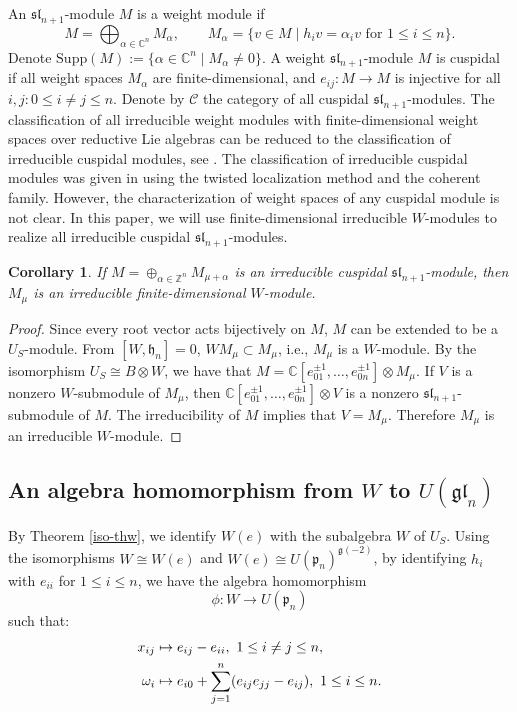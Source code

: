 \documentclass[12pt,a4paper]{amsart}
\newtheorem{corollary}[theorem]{Corollary}%
\numberwithin{equation}{section}
\newcommand{\C}{\mathbb C}
\newcommand{\Z}{\mathbb{Z}}
\def\mg{\mathfrak{g}}
\def\mh{\mathfrak{h}}
\def\sl{\mathfrak{sl}}
\def\gl{\mathfrak{gl}}
\begin{document}
An $\sl_{n+1}$-module $M$ is a weight module if
\[
 M=\bigoplus_{\alpha\in\C^n}M_\alpha,
 \qquad
 M_\alpha=\{v\in M\mid h_iv=\alpha_iv\text{ for }1\leq i\leq n\}.
\]
 Denote $\mathrm{Supp}(M):=\{\alpha\in \C^n \mid M_\alpha\neq0\}$.
A weight
$\sl_{n+1}$-module $M$ is cuspidal if  all weight spaces $M_{\alpha}$ are finite-dimensional, and $e_{ij}: M\rightarrow
M$ is  injective for all $i, j: 0\leq i \neq j \leq n$.  Denote by $\mathcal{C}$ the category of all cuspidal
$\sl_{n+1}$-modules.
The classification of all irreducible weight
modules with finite-dimensional weight spaces over reductive Lie algebras can be reduced to the classification of irreducible cuspidal modules, see \cite{F}. The classification of irreducible cuspidal modules was given in \cite{M} using  the twisted localization method and the coherent family. However, the characterization of weight spaces of any cuspidal module is not clear.
 In this paper, we will use
finite-dimensional irreducible $W$-modules to realize  all irreducible cuspidal
$\sl_{n+1}$-modules.

\begin{corollary}\label{weight-space} If $M=\oplus_{\alpha\in \Z^n} M_{\mu+\alpha}$ is an irreducible cuspidal $\sl_{n+1}$-module,
then $M_{\mu}$ is an irreducible finite-dimensional $W$-module.
\end{corollary}

\begin{proof}Since every root vector acts bijectively on
$M$, $M$ can be extended to be a $U_S$-module. From $[W,\mh_n]=0$,
$WM_{\mu}\subset M_{\mu}$, i.e., $M_{\mu}$ is a $W$-module.
By the isomorphism $U_{S}\cong B \otimes W $, we have that
$M=\C[e_{01}^{\pm1},\dots,e_{0n}^{\pm 1}]\otimes M_{\mu}$.
If $V$ is a nonzero $W$-submodule of  $M_{\mu}$, then $\C[e_{01}^{\pm1},\dots,e_{0n}^{\pm 1}]\otimes V$ is a nonzero
$\sl_{n+1}$-submodule of $M$.
The irreducibility of
$M$ implies that  $V= M_{\mu}$. Therefore $M_{\mu}$ is an irreducible $W$-module.
\end{proof}

\subsection{An algebra homomorphism from $W$ to $U(\gl_n)$}

By Theorem \ref{iso-thw}, we identify $W(e)$ with the subalgebra $W$ of $U_S$. Using the isomorphisms  $W\cong W(e)$ and $ W(e)\cong U(\mathfrak{p}_n)^{\mg(-2)}$, by identifying $h_i$ with $e_{ii}$ for $1\leq i\leq n$,
we have the  algebra homomorphism
 $$\phi:W\rightarrow U(\mathfrak{p}_n)$$ such that:
\begin{equation}\label{x-w-act1}\aligned x_{ij} & \mapsto  e_{ij}-e_{ii},\ 1\leq i\neq j\leq n,\\
 \omega_i
&\mapsto e_{i0}+\sum_{j=1}^n (e_{ij}e_{jj}-e_{ij}),\ 1\leq i\leq n.
\endaligned \end{equation}
\end{document}
